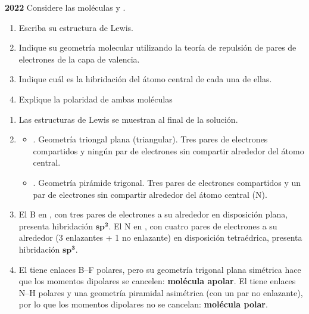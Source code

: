 \begin{exerciseEVAU}
    \textbf{2022} Considere las moléculas  y .

    \begin{enumerate}[label=\letraminuscula]
        \item Escriba su estructura de Lewis.
        \item Indique su geometría molecular utilizando la teoría de repulsión de pares de electrones de la capa de valencia.
        \item Indique cuál es la hibridación del átomo central de cada una de ellas.
        \item Explique la polaridad de ambas moléculas
    \end{enumerate}

    \begin{solu}
        \begin{enumerate}[label=\letraminuscula]
            \item Las estructuras de Lewis se muestran al final de la solución.
            \item \begin{itemize}
                      \item {}.
                      Geometría triongal plana (triangular).
                      Tres pares de electrones compartidos y ningún par de electrones sin compartir alrededor del átomo central.
                      \item {}.
                      Geometría pirámide trigonal.
                      Tres pares de electrones compartidos y un par de electrones sin compartir alrededor del átomo central (N).
            \end{itemize}

            \item El B en , con tres pares de electrones a su alrededor en disposición plana, presenta hibridación \(\bm{sp^2}\). El N en , con cuatro pares de electrones a su alrededor (3 enlazantes + 1 no enlazante) en disposición tetraédrica, presenta hibridación \(\bm{sp^3}\).

            \item El  tiene enlaces B--F polares, pero su geometría trigonal plana simétrica hace que los momentos dipolares se cancelen: \textbf{molécula apolar}. El  tiene enlaces N--H polares y una geometría piramidal asimétrica (con un par no enlazante), por lo que los momentos dipolares no se cancelan: \textbf{molécula polar}.
        \end{enumerate}


\end{solu}
\end{exerciseEVAU}
